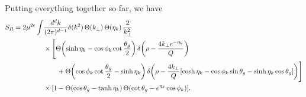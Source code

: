 \documentclass[11pt,twoside,reqno]{amsart}
\theoremstyle{plain}
\theoremstyle{remark}
\theoremstyle{definition}
\theoremstyle{remark}
\theoremstyle{definition}
\theoremstyle{definition}
\begin{document}
	Putting everything together so far, we have
	\begin{equation}
	\begin{aligned}
		S_R = 2\mu^{2\epsilon} \int &\frac{d^d k}{(2\pi)^{d-1}} \delta(k^2)\,\Theta(k_\perp) \,\Theta(\eta_k)\,\frac{2}{k_\perp^2} \\
			&\times \Bigg[ \Theta\qty(\sinh\eta_k - \cos\phi_k\cot\frac{\theta_g}{2})\,\delta\qty(\rho - \frac{4 k_\perp e^{-\eta_k}}{Q}) \\
			&\qquad+ \Theta\qty(\cos\phi_k\cot\frac{\theta_g}{2} - \sinh\eta_k)\, \delta\qty(\rho - \frac{4 k_\perp}{Q}\qty[\cosh\eta_k - \cos\phi_k\sin\theta_g - \sinh\eta_k\cos\theta_g])\Bigg] \\
			&\times \qty[1 - \Theta(\cos\theta_g - \tanh\eta_k)\,\Theta\qty(\cot\theta_g - e^{\eta_k}\cos\phi_k)].
	\end{aligned}
	\end{equation}
\end{document}
